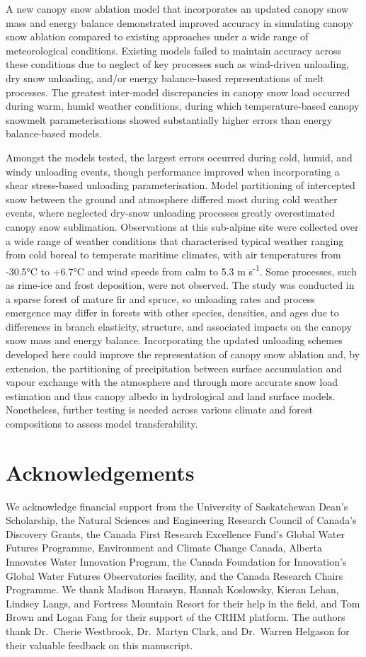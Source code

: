 \documentclass[
  letterpaper,
]{tex/uofsthesis-cs}
\begin{document}
A new canopy snow ablation model that incorporates an updated canopy
snow mass and energy balance demonstrated improved accuracy in
simulating canopy snow ablation compared to existing approaches under a
wide range of meteorological conditions. Existing models failed to
maintain accuracy across these conditions due to neglect of key
processes such as wind-driven unloading, dry snow unloading, and/or
energy balance-based representations of melt processes. The greatest
inter-model discrepancies in canopy snow load occurred during warm,
humid weather conditions, during which temperature-based canopy snowmelt
parameterisations showed substantially higher errors than energy
balance-based models.

Amongst the models tested, the largest errors occurred during cold,
humid, and windy unloading events, though performance improved when
incorporating a shear stress-based unloading parameterisation. Model
partitioning of intercepted snow between the ground and atmosphere
differed most during cold weather events, where neglected dry-snow
unloading processes greatly overestimated canopy snow sublimation.
Observations at this sub-alpine site were collected over a wide range of
weather conditions that characterised typical weather ranging from cold
boreal to temperate maritime climates, with air temperatures from
-30.5°C to +6.7°C and wind speeds from calm to 5.3 m
s\textsuperscript{-1}. Some processes, such as rime-ice and frost
deposition, were not observed. The study was conducted in a sparse
forest of mature fir and spruce, so unloading rates and process
emergence may differ in forests with other species, densities, and ages
due to differences in branch elasticity, structure, and associated
impacts on the canopy snow mass and energy balance. Incorporating the
updated unloading schemes developed here could improve the
representation of canopy snow ablation and, by extension, the
partitioning of precipitation between surface accumulation and vapour
exchange with the atmosphere and through more accurate snow load
estimation and thus canopy albedo in hydrological and land surface
models. Nonetheless, further testing is needed across various climate
and forest compositions to assess model transferability.

\section{Acknowledgements}\label{acknowledgements}

We acknowledge financial support from the University of Saskatchewan
Dean's Scholarship, the Natural Sciences and Engineering Research
Council of Canada's Discovery Grants, the Canada First Research
Excellence Fund's Global Water Futures Programme, Environment and
Climate Change Canada, Alberta Innovates Water Innovation Program, the
Canada Foundation for Innovation's Global Water Futures Observatories
facility, and the Canada Research Chairs Programme. We thank Madison
Harasyn, Hannah Koslowsky, Kieran Lehan, Lindsey Langs, and Fortress
Mountain Resort for their help in the field, and Tom Brown and Logan
Fang for their support of the CRHM platform. The authors thank
Dr.~Cherie Westbrook, Dr.~Martyn Clark, and Dr.~Warren Helgason for
their valuable feedback on this manuscript.
\end{document}
